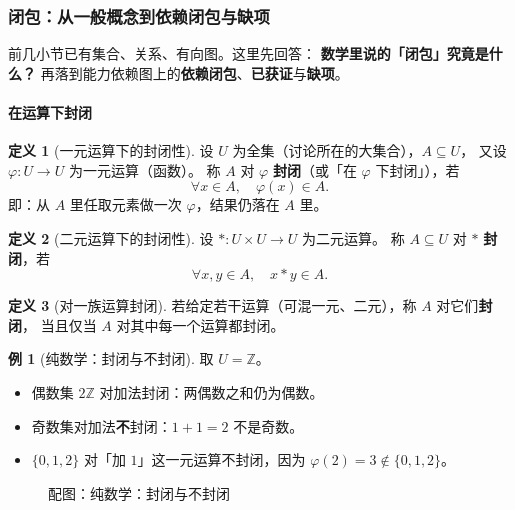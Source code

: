\documentclass[UTF8,a4paper,11pt]{ctexart}
\theoremstyle{definition}
\newtheorem{definition}{定义}[section]
\newtheorem{example}{例}[section]
\theoremstyle{plain}
\theoremstyle{remark}
\numberwithin{figure}{section}
\numberwithin{table}{section}
\begin{document}
\subsubsection{闭包：从一般概念到依赖闭包与缺项}
\label{sec:closure}

前几小节已有集合、关系、有向图。这里先回答：
\textbf{数学里说的「闭包」究竟是什么？}
再落到能力依赖图上的\textbf{依赖闭包}、\textbf{已获证}与\textbf{缺项}。

\paragraph{在运算下封闭}

\begin{definition}[一元运算下的封闭性]
设 $U$ 为全集（讨论所在的大集合），$A\subseteq U$，
又设 $\varphi:U\to U$ 为一元运算（函数）。
称 $A$ 对 $\varphi$ \textbf{封闭}（或「在 $\varphi$ 下封闭」），若
\[
\forall x\in A,\quad \varphi(x)\in A.
\]
即：从 $A$ 里任取元素做一次 $\varphi$，结果仍落在 $A$ 里。
\end{definition}

\begin{definition}[二元运算下的封闭性]
设 $*\!:U\times U\to U$ 为二元运算。
称 $A\subseteq U$ 对 $*$ \textbf{封闭}，若
\[
\forall x,y\in A,\quad x*y\in A.
\]
\end{definition}

\begin{definition}[对一族运算封闭]
若给定若干运算（可混一元、二元），称 $A$ 对它们\textbf{封闭}，
当且仅当 $A$ 对其中每一个运算都封闭。
\end{definition}

\begin{example}[纯数学：封闭与不封闭]
取 $U=\mathbb{Z}$。
\begin{itemize}
  \item 偶数集 $2\mathbb{Z}$ 对加法封闭：两偶数之和仍为偶数。
  \item 奇数集对加法\textbf{不}封闭：$1+1=2$ 不是奇数。
  \item $\{0,1,2\}$ 对「加 $1$」这一元运算不封闭，因为 $\varphi(2)=3\notin\{0,1,2\}$。
\end{itemize}
\begin{figure}[H]
\centering
{}
\caption{配图：纯数学：封闭与不封闭}
\label{fig:auto-06}
\end{figure}
\end{example}
\end{document}
